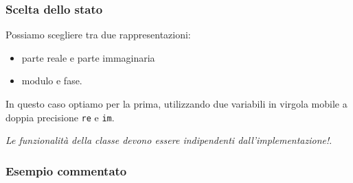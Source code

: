 \documentclass{article}
\begin{document}
\subsubsection{Scelta dello stato}
Possiamo scegliere tra due rappresentazioni:
\begin{itemize}
\item parte reale e parte immaginaria 
\item modulo e fase.
\end{itemize}

In questo caso optiamo per la prima, utilizzando due variabili in virgola mobile a doppia precisione \texttt{re} e \texttt{im}.

\emph{Le funzionalità della classe devono essere indipendenti dall'implementazione!}.

\subsubsection{Esempio commentato}
\end{document}

